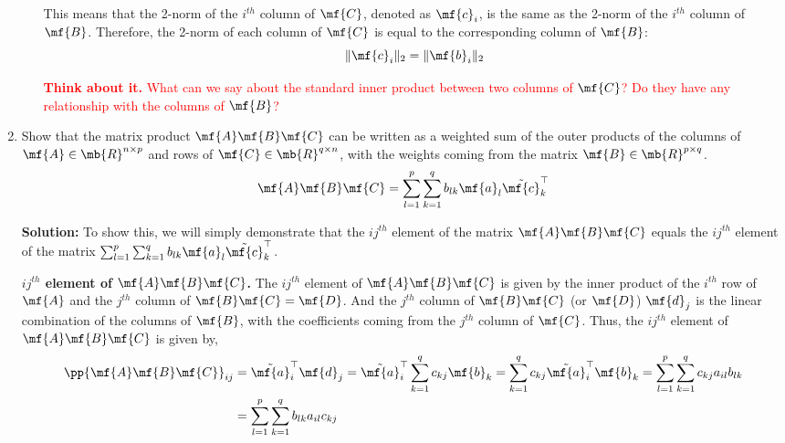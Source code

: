 \begin{enumerate}
\begin{enumerate}
\begin{boxedstuff}
            This means that the 2-norm of the $i^{th}$ column of $\mf{C}$, denoted as $\mf{c}_i$, is the same as the 2-norm of the $i^{th}$ column of $\mf{B}$. Therefore, the 2-norm of each column of $\mf{C}$ is equal to the corresponding column of $\mf{B}$:
            $$ \Vert \mf{c}_i \Vert_2 = \Vert \mf{b}_i \Vert_2 $$
        
            \textcolor{red}{\textbf{Think about it.} What can we say about the standard inner product between two columns of $\mf{C}$? Do they have any relationship with the columns of $\mf{B}$?}
        \end{boxedstuff}
    \end{enumerate}

    \item Show that the matrix product $\mf{A}\mf{B}\mf{C}$ can be written as a weighted sum of the outer products of the columns of $\mf{A} \in \mb{R}^{n \times p}$ and rows of $\mf{C} \in \mb{R}^{q \times n}$, with the weights coming from the matrix $\mf{B} \in \mb{R}^{p \times q}$.
    \[
    \mf{A}\mf{B}\mf{C} = \sum_{l=1}^p \sum_{k=1}^q b_{lk} \mf{a}_l \tilde{\mf{c}}_k^\top
    \]
    \begin{boxedstuff}
        \vspace{4mm}
        \textbf{Solution:} To show this, we will simply demonstrate that the $ij^{th}$ element of the matrix $\mf{A}\mf{B}\mf{C}$ equals the $ij^{th}$ element of the matrix $\sum_{l=1}^p \sum_{k=1}^q b_{lk} \mf{a}_l \tilde{\mf{c}}_k^\top$.

        \textbf{${ij}^{th}$ element of $\mf{A}\mf{B}\mf{C}$.} The $ij^{th}$ element of $\mf{A}\mf{B}\mf{C}$ is given by the inner product of the $i^{th}$ row of $\mf{A}$ and the $j^{th}$ column of $\mf{B}\mf{C} = \mf{D}$. And the $j^{th}$ column of $\mf{B}\mf{C}$ (or $\mf{D}$) $\mf{d}_j$ is the linear combination of the columns of $\mf{B}$, with the coefficients coming from the $j^{th}$ column of $\mf{C}$. Thus, the $ij^{th}$ element of $\mf{A}\mf{B}\mf{C}$ is given by,
        \[ \begin{split}
            \pp{\mf{A}\mf{B}\mf{C}}_{ij} &= \tilde{\mf{a}}_i^\top\mf{d}_j = \tilde{\mf{a}}_i^\top\sum_{k=1}^q c_{kj} \mf{b}_k = \sum_{k=1}^q c_{kj} \tilde{\mf{a}}_i^\top \mf{b}_k = \sum_{l=1}^p \sum_{k=1}^q c_{kj} a_{il} b_{lk} \\
            &= \sum_{l=1}^p \sum_{k=1}^q  b_{lk} a_{il} c_{kj}
        \end{split} \]


\end{boxedstuff}
\end{enumerate}
